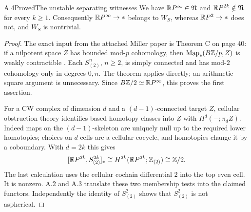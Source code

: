 \begin{claim}{A.4}{Proved}{The unstable separating witnesses}\label{A4}
We have $\mathbb{R}P^\infty\in\mathfrak N$ and $\mathbb{R}P^{2k}\notin\mathfrak N$ for every $k\geq1$. Consequently $\mathbb{R}P^\infty\to *$ belongs to $W_S$, whereas $\mathbb{R}P^2\to *$ does not, and $W_S$ is nontrivial.
\end{claim}
\begin{proof}
The exact input from the attached Miller paper is Theorem C on page 40: if a nilpotent space $Z$ has bounded mod-$p$ cohomology, then $\operatorname{Map}_*(B\mathbb Z/p,Z)$ is weakly contractible \citep[Theorem C]{Miller1984}. Each $S^n_{(2)}$, $n\geq2$, is simply connected and has mod-$2$ cohomology only in degrees $0,n$. The theorem applies directly; an arithmetic-square argument is unnecessary. Since $B\mathbb Z/2\simeq\mathbb{R}P^\infty$, this proves the first assertion.

For a CW complex of dimension $d$ and a $(d-1)$-connected target $Z$, cellular obstruction theory identifies based homotopy classes into $Z$ with $H^d(-;\pi_d Z)$. Indeed maps on the $(d-1)$-skeleton are uniquely null up to the required lower homotopies; choices on $d$-cells are a cellular cocycle, and homotopies change it by a coboundary. With $d=2k$ this gives
\[
 [\mathbb{R}P^{2k},S^{2k}_{(2)}]_*\cong
 H^{2k}(\mathbb{R}P^{2k};\mathbb Z_{(2)})\cong\mathbb Z/2.
\]
The last calculation uses the cellular cochain differential $2$ into the top even cell. It is nonzero. A.2 and A.3 translate these two membership tests into the claimed functors. Independently the identity of $S^2_{(2)}$ shows that $S^2_{(2)}$ is not aspherical.
\end{proof}


